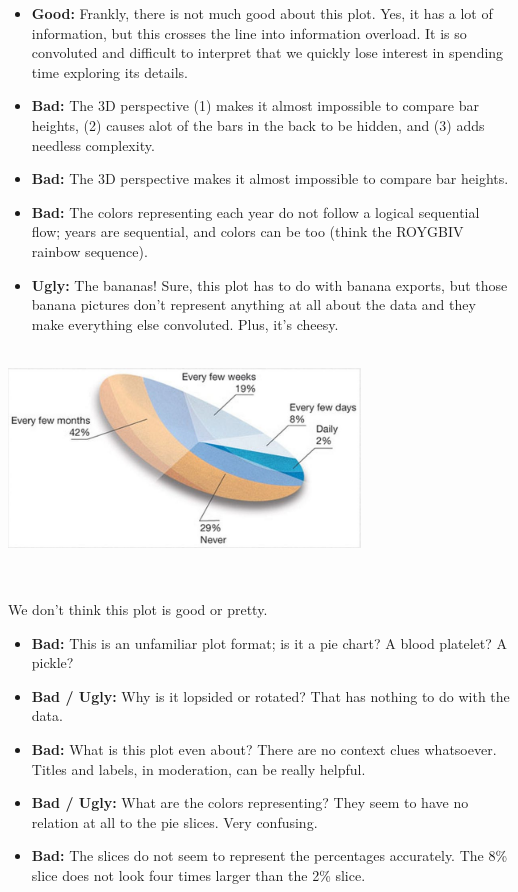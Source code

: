 \documentclass[
]{book}
\providecommand{\tightlist}{%
  \setlength{\itemsep}{0pt}\setlength{\parskip}{0pt}}
\begin{document}
\begin{itemize}
\tightlist
\item
  \textbf{Good:} Frankly, there is not much good about this plot. Yes, it has a lot of information, but this crosses the line into information overload. It is so convoluted and difficult to interpret that we quickly lose interest in spending time exploring its details.\\
\item
  \textbf{Bad:} The 3D perspective (1) makes it almost impossible to compare bar heights, (2) causes alot of the bars in the back to be hidden, and (3) adds needless complexity.\\
\item
  \textbf{Bad:} The 3D perspective makes it almost impossible to compare bar heights.
\item
  \textbf{Bad:} The colors representing each year do not follow a logical sequential flow; years are sequential, and colors can be too (think the ROYGBIV rainbow sequence).\\
\item
  \textbf{Ugly:} The bananas! Sure, this plot has to do with banana exports, but those banana pictures don't represent anything at all about the data and they make everything else convoluted. Plus, it's cheesy.
\end{itemize}

~\\

\includegraphics[width=0.7\textwidth,height=\textheight]{img/vis2.jpeg}

~

We don't think this plot is good or pretty.

\begin{itemize}
\tightlist
\item
  \textbf{Bad:} This is an unfamiliar plot format; is it a pie chart? A blood platelet? A pickle?
\item
  \textbf{Bad / Ugly:} Why is it lopsided or rotated? That has nothing to do with the data.
\item
  \textbf{Bad:} What is this plot even about? There are no context clues whatsoever. Titles and labels, in moderation, can be really helpful.
\item
  \textbf{Bad / Ugly:} What are the colors representing? They seem to have no relation at all to the pie slices. Very confusing.
\item
  \textbf{Bad:} The slices do not seem to represent the percentages accurately. The 8\% slice does not look four times larger than the 2\% slice.
\end{itemize}
\end{document}
